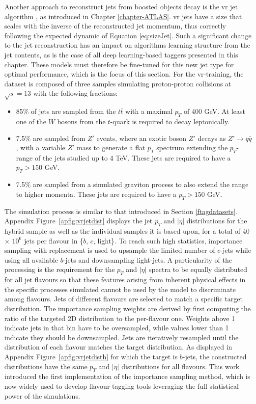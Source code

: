 Another approach to reconstruct jets from boosted objects decay is the \gls{vr} jet algorithm \cite{vrJetPaper}, as introduced in Chapter \ref{chapter-ATLAS}. \gls{vr} jets have a size that scales with the inverse of the reconstructed jet momentum, thus correctly following the expected dynamic of Equation \ref{eq:sizeJet}. Such a significant change to the jet reconstruction has an impact on algorithms learning structure from the jet contents, as is the case of all deep learning-based taggers presented in this chapter. These models must therefore be fine-tuned for this new jet type for optimal performance, which is the focus of this section. For the \gls{vr}-training, the dataset is composed of three samples simulating proton-proton collisions at $\sqrt{s} = 13$ with the following fractions:
\begin{itemize}
  \item 85\% of jets are sampled from the $t\bar{t}$ with a maximal $p_T$ of 400 GeV. At least one of the $W$ bosons from the $t$-quark is required to decay leptonically.
  \item 7.5\% are sampled from $Z'$ events, where an exotic boson $Z'$ decays as $Z' \rightarrow q\bar{q}$, with a variable $Z'$ mass to generate a flat $p_T$ spectrum extending the $p_T$-range of the jets studied up to 4 TeV. These jets are required to have a $p_T > 150$ GeV.
  \item 7.5\% are sampled from a simulated graviton process to also extend the range to higher momenta. These jets are required to have a $p_T > 150$ GeV.
\end{itemize}

The simulation process is similar to that introduced in Section \ref{ftagdatasets}. Appendix Figure~\ref{apfig:vrjetdist} displays the jet $p_T$ and $|\eta|$ distributions for the hybrid sample as well as the individual samples it is based upon, for a total of 40 $\times$ $10^6$ jets per flavour in \{$b$, $c$, light\}. To reach such high statistics, importance sampling with replacement is used to upsample the limited number of $c$-jets while using all available $b$-jets and downsampling light-jets. A particularity of the processing is the requirement for the $p_T$ and $|\eta|$ spectra to be equally distributed for all jet flavours so that these features arising from inherent physical effects in the specific processes simulated cannot be used by the model to discriminate among flavours. Jets of different flavours are selected to match a specific target distribution. The importance sampling weights are derived by first computing the ratio of the targeted 2D distribution to the per-flavour one. Weights above 1 indicate jets in that bin have to be oversampled, while values lower than 1 indicate they should be downsampled. Jets are iteratively resampled until the distribution of each flavour matches the target distribution. As displayed in Appendix Figure~\ref{apfig:vrjetdisth} for which the target is $b$-jets, the constructed distributions have the same $p_T$ and $|\eta|$ distributions for all flavours. This work introduced the first implementation of the importance sampling method, which is now widely used to develop flavour tagging tools leveraging the full statistical power of the simulations. \\ 
 
